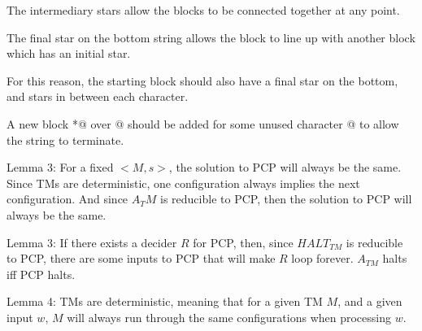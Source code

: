 \documentclass[letterpaper,notitlepage,twoside]{article}
\begin{document}
The intermediary stars allow the blocks to be connected together at any point. 

The final star on the bottom string allows the block to line up with another block which has an initial star.

For this reason, the starting block should also have a final star on the bottom, and stars in between each character.

A new block *@ over @ should be added for some unused character @ to allow the string to terminate.

Lemma 3: For a fixed $<M, s>$, the solution to PCP will always be the same.
Since TMs are deterministic, one configuration always implies the next configuration. And since $A_TM$ is reducible to PCP, then the solution to PCP will always be the same.


Lemma 3: If there exists a decider $R$ for PCP, then, since $HALT_{TM}$ is reducible to PCP, there are some inputs to PCP that will make $R$ loop forever. $A_{TM}$ halts iff PCP halts.

Lemma 4: TMs are deterministic, meaning that for a given TM $M$, and a given input $w$, $M$ will always run through the same configurations when processing $w$.
\end{document}
